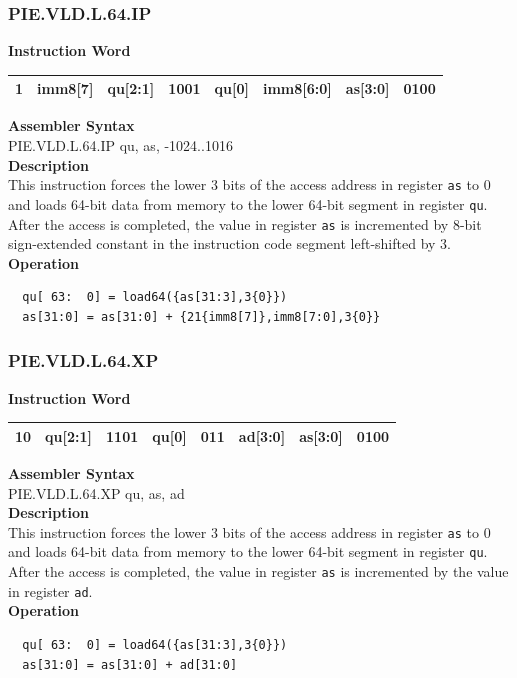 \newpage
\subsubsection{PIE.VLD.L.64.IP}\label{instruction:PIEVLDL64IP}
\setlength\tabcolsep{6pt}
\textbf{Instruction Word} \\
\begin{tabular}{|c|c|c|c|c|c|c|c|}
	\hline
	1 & imm8[7] & qu[2:1] & 1001 & qu[0] & imm8[6:0] & as[3:0] & 0100 \\
	\hline
\end{tabular}

\textbf{Assembler Syntax} \\
PIE.VLD.L.64.IP qu, as, -1024..1016 \\
\textbf{Description} \\
This instruction forces the lower 3 bits of the access address in register \lstinline{as} to 0 and loads 64-bit data from memory to the lower 64-bit segment in register \lstinline{qu}. After the access is completed, the value in register \lstinline{as} is incremented by 8-bit sign-extended constant in the instruction code segment left-shifted by 3.\\
\textbf{Operation}
\begin{lstlisting}
  qu[ 63:  0] = load64({as[31:3],3{0}})
  as[31:0] = as[31:0] + {21{imm8[7]},imm8[7:0],3{0}}
\end{lstlisting}

\newpage
\subsubsection{PIE.VLD.L.64.XP}\label{instruction:PIEVLDL64XP}
\setlength\tabcolsep{6pt}
\textbf{Instruction Word} \\
\begin{tabular}{|c|c|c|c|c|c|c|c|}
	\hline
	10 & qu[2:1] & 1101 & qu[0] & 011 & ad[3:0] & as[3:0] & 0100 \\
	\hline
\end{tabular}

\textbf{Assembler Syntax} \\
PIE.VLD.L.64.XP qu, as, ad \\
\textbf{Description} \\
This instruction forces the lower 3 bits of the access address in register \lstinline{as} to 0 and loads 64-bit data from memory to the lower 64-bit segment in register \lstinline{qu}. After the access is completed, the value in register \lstinline{as} is incremented by the value in register \lstinline{ad}.\\
\textbf{Operation}
\begin{lstlisting}
  qu[ 63:  0] = load64({as[31:3],3{0}})
  as[31:0] = as[31:0] + ad[31:0]
\end{lstlisting}

